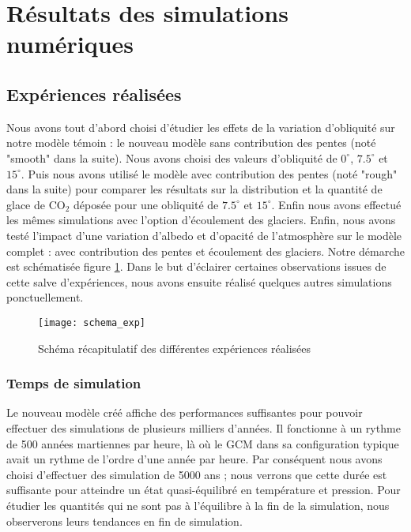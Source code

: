 \documentclass[11pt,a4paper]{article}
\begin{document}
\clearpage
\section{Résultats des simulations numériques}
\subsection{Expériences réalisées}
Nous avons tout d'abord choisi d'étudier les effets de la variation d'obliquité sur notre modèle témoin : le nouveau modèle sans contribution des pentes (noté "smooth" dans la suite). Nous avons choisi des valeurs d'obliquité de $0^\circ$, $7.5^\circ$ et $15^\circ$. Puis nous avons utilisé le modèle avec contribution des pentes (noté "rough" dans la suite) pour comparer les résultats sur la distribution et la quantité de glace de CO$_2$ déposée pour une obliquité de $7.5^\circ$ et $15^\circ$. Enfin nous avons effectué les mêmes simulations avec l'option d'écoulement des glaciers. Enfin, nous avons testé l'impact d'une variation d'albedo et d'opacité de l'atmosphère sur le modèle complet : avec contribution des pentes et écoulement des glaciers. Notre démarche est schématisée figure \ref{schema_exp}. Dans le but d'éclairer certaines observations issues de cette salve d'expériences, nous avons ensuite réalisé quelques autres simulations ponctuellement. \\

\begin{figure}[h!]
\begin{center}
\texttt{[image: schema\_exp]}
\caption{Schéma récapitulatif des différentes expériences réalisées}
\label{schema_exp}
\end{center}
\end{figure}

\subsubsection{Temps de simulation}
Le nouveau modèle créé affiche des performances suffisantes pour pouvoir effectuer des simulations de plusieurs milliers d'années. Il fonctionne à un rythme de 500 années martiennes par heure, là où le GCM dans sa configuration typique avait un rythme de l'ordre d'une année par heure. Par conséquent nous avons choisi d'effectuer des simulation de 5000 ans ; nous verrons que cette durée est suffisante pour atteindre un état quasi-équilibré en température et pression. Pour étudier les quantités qui ne sont pas à l'équilibre à la fin de la simulation, nous observerons leurs tendances en fin de simulation. \\
\end{document}
